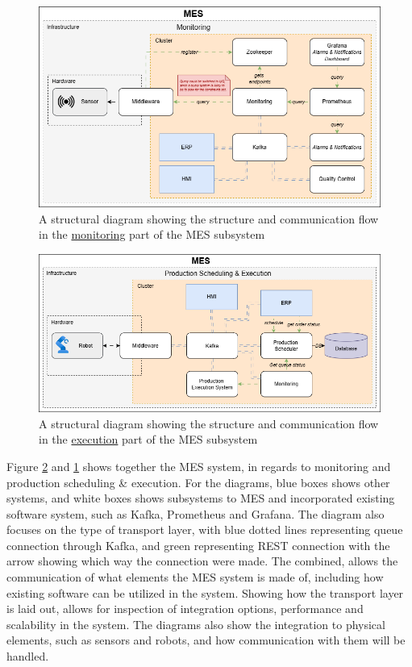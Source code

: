 \begin{figure}[H]
    \centering
    \caption{A structural diagram showing the structure and communication flow in the \underline{monitoring} part of the MES subsystem}
    \label{fig:systems_and_subsystems-mes_monitoring_systemdiagram}
    \includegraphics[width=1\linewidth]{report/GroupTemplate/images/MES_monitoring.png}
\end{figure}

\begin{figure}[H]
    \centering
    \caption{A structural diagram showing the structure and communication flow in the \underline{execution} part of the MES subsystem}
    \label{fig:systems_and_subsystems-mes_execution_systemdiagram}
    \includegraphics[width=1\linewidth]{report/GroupTemplate/images/mes-execution.png}
\end{figure}

Figure \ref{fig:systems_and_subsystems-mes_execution_systemdiagram} and \ref{fig:systems_and_subsystems-mes_monitoring_systemdiagram} shows together the MES system, in regards to monitoring and production scheduling \& execution.
For the diagrams, blue boxes shows other systems, and white boxes shows subsystems to MES and incorporated existing software system, such as Kafka, Prometheus and Grafana.
The diagram also focuses on the type of transport layer, with blue dotted lines representing queue connection through Kafka, and green representing REST connection with the arrow showing which way the connection were made.
The combined, allows the communication of what elements the MES system is made of, including how existing software can be utilized in the system. Showing how the transport layer is laid out, allows for inspection of integration options, performance and scalability in the system.
The diagrams also show the integration to physical elements, such as sensors and robots, and how communication with them will be handled.


